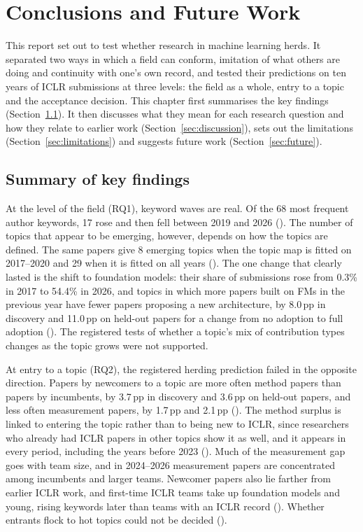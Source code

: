 \chapter{Conclusions and Future Work}
\label{sec:conclusion}

This report set out to test whether research in machine learning herds. It separated two ways in which a field can
conform, imitation of what others are doing and continuity with one's own record, and tested their predictions on ten
years of ICLR submissions at three levels: the field as a whole, entry to a topic and the acceptance decision. This
chapter first summarises the key findings (Section~\ref{sec:findings}). It then discusses what they mean for each
research question and how they relate to earlier work (Section~\ref{sec:discussion}), sets out the limitations
(Section~\ref{sec:limitations}) and suggests future work (Section~\ref{sec:future}).

\section{Summary of key findings}
\label{sec:findings}

At the level of the field (RQ1), keyword waves are real. Of the 68 most frequent author keywords, 17 rose and then fell
between 2019 and 2026 (). The number of topics that appear to be emerging, however, depends on how the
topics are defined. The same papers give 8 emerging topics when the topic map is fitted on 2017--2020 and 29 when it is
fitted on all years (). The one change that clearly lasted is the shift to foundation models: their
share of submissions rose from 0.3\% in 2017 to 54.4\% in 2026, and topics in which more papers built on FMs in the
previous year have fewer papers proposing a new architecture, by 8.0\,pp in discovery and 11.0\,pp on held-out papers
for a change from no adoption to full adoption (). The registered tests of whether a topic's mix of
contribution types changes as the topic grows were not supported.

At entry to a topic (RQ2), the registered herding prediction failed in the opposite direction. Papers by newcomers to a
topic are more often method papers than papers by incumbents, by 3.7\,pp in discovery and 3.6\,pp on held-out papers,
and less often measurement papers, by 1.7\,pp and 2.1\,pp (). The method surplus is linked to entering
the topic rather than to being new to ICLR, since researchers who already had ICLR papers in other topics show it as
well, and it appears in every period, including the years before 2023 (). Much of the measurement gap
goes with team size, and in 2024--2026 measurement papers are concentrated among incumbents and larger teams. Newcomer
papers also lie farther from earlier ICLR work, and first-time ICLR teams take up foundation models and young, rising
keywords later than teams with an ICLR record (). Whether entrants flock to hot topics could not be
decided ().

